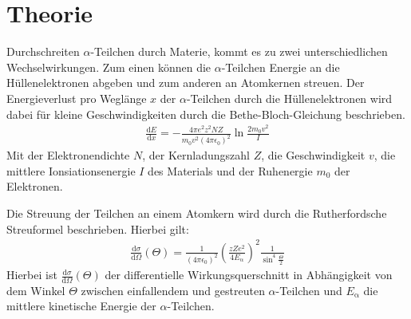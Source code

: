 \section{Theorie}
\label{sec:Theorie}
Durchschreiten $\alpha$-Teilchen durch Materie, kommt es zu zwei unterschiedlichen Wechselwirkungen.
Zum einen können die $\alpha$-Teilchen Energie an die Hüllenelektronen abgeben und zum anderen
an Atomkernen streuen. Der Energieverlust pro Weglänge $x$ der $\alpha$-Teilchen durch die Hüllenelektronen wird dabei für
kleine Geschwindigkeiten durch die
Bethe-Bloch-Gleichung beschrieben.
\begin{align}
  \frac{\mathrm{d}E}{\mathrm{d}x} = - \frac{4\pi e^2 z^2 N Z}{m_{\mathrm{0}}v^2(4 \pi \epsilon_{\mathrm{0}})^2} \ln{\frac{2 m_{\mathrm{0}} v^2}{I}}
\end{align}
Mit der Elektronendichte $N$, der Kernladungszahl $Z$, die Geschwindigkeit $v$, die mittlere Ionsiationsenergie $I$ des Materials
und der Ruhenergie $m_{\mathrm{0}}$ der Elektronen.

Die Streuung der Teilchen an einem Atomkern wird durch die Rutherfordsche Streuformel beschrieben. Hierbei gilt:
\begin{align}
  \frac{\mathrm{d}\sigma}{\mathrm{d}\Omega}(\Theta) = \frac{1}{(4 \pi \epsilon_{\mathrm{0}})^2} \left(\frac{z Z e^2}{4 E_{\mathrm{\alpha}}}\right)^2 \frac{1}{\sin^4{\frac{\Theta}{2}}}
\end{align}
Hierbei ist $\frac{\mathrm{d}\sigma}{\mathrm{d}\Omega}(\Theta)$ der differentielle Wirkungsquerschnitt in Abhängigkeit von dem Winkel $\Theta$
zwischen einfallendem und gestreuten $\alpha$-Teilchen und
$E_{\mathrm{\alpha}}$ die mittlere kinetische Energie der $\alpha$-Teilchen.
